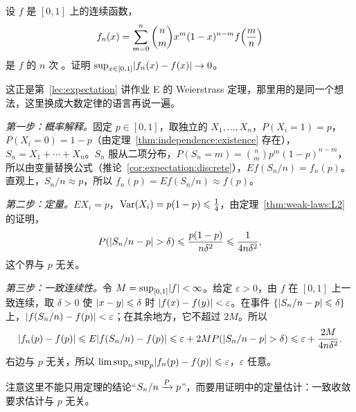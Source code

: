 \begin{workedexample}[多项式逼近]\label{we:weak-laws:bernstein}
设 $f$ 是 $[0,1]$ 上的连续函数，
\[
f_n(x)=\sum_{m=0}^n\binom nmx^m(1-x)^{n-m}f\Bigl(\frac mn\Bigr)
\]
是 $f$ 的 $n$ 次 。证明 $\sup_{x\in[0,1]}\lvert f_n(x)-f(x)\rvert\to0$。
\end{workedexample}
\begin{solution}
这正是第~\ref{lec:expectation} 讲作业 E 的 Weierstrass 定理，那里用的是同一个想法，这里换成大数定律的语言再说一遍。

\emph{第一步：概率解释。}固定 $p\in[0,1]$，取独立的 $X_1,\dots,X_n$，$P(X_i=1)=p$，$P(X_i=0)=1-p$（由定理~\ref{thm:independence:existence} 存在），$S_n=X_1+\cdots+X_n$。$S_n$ 服从二项分布，$P(S_n=m)=\binom nmp^m(1-p)^{n-m}$，所以由变量替换公式（推论~\ref{cor:expectation:discrete}），$Ef(S_n/n)=f_n(p)$。直观上，$S_n/n\approx p$，所以 $f_n(p)=Ef(S_n/n)\approx f(p)$。

\emph{第二步：定量。}$EX_i=p$，$\operatorname{Var}(X_i)=p(1-p)\leqslant\frac14$，由定理~\ref{thm:weak-laws:L2} 的证明，
\[
P(\lvert S_n/n-p\rvert>\delta)\leqslant\frac{p(1-p)}{n\delta^2}\leqslant\frac1{4n\delta^2},
\]
这个界与 $p$ 无关。

\emph{第三步：一致连续性。}令 $M=\sup_{[0,1]}\lvert f\rvert<\infty$。给定 $\varepsilon>0$，由 $f$ 在 $[0,1]$ 上一致连续，取 $\delta>0$ 使 $\lvert x-y\rvert\leqslant\delta$ 时 $\lvert f(x)-f(y)\rvert<\varepsilon$。在事件 $\{\lvert S_n/n-p\rvert\leqslant\delta\}$ 上，$\lvert f(S_n/n)-f(p)\rvert<\varepsilon$；在其余地方，它不超过 $2M$。所以
\[
\lvert f_n(p)-f(p)\rvert\leqslant E\lvert f(S_n/n)-f(p)\rvert\leqslant\varepsilon+2MP(\lvert S_n/n-p\rvert>\delta)\leqslant\varepsilon+\frac{2M}{4n\delta^2}.
\]
右边与 $p$ 无关，所以 $\limsup_n\sup_p\lvert f_n(p)-f(p)\rvert\leqslant\varepsilon$，$\varepsilon$ 任意。

注意这里不能只用定理的结论“$S_n/n\xrightarrow{P} p$”，而要用证明中的定量估计：一致收敛要求估计与 $p$ 无关。
\end{solution}


